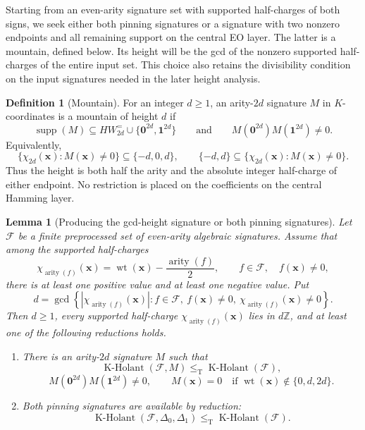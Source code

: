 \documentclass[11pt,letterpaper,onecolumn]{article}
\theoremstyle{plain}
\newtheorem{lemma}[lemma]{Lemma}
\theoremstyle{definition}
\newtheorem{definition}[definition]{Definition}
\theoremstyle{remark}
\newcommand{\cF}{\mathcal F}
\newcommand{\KHolant}{\operatorname{K\text{-}Holant}}
\newcommand{\wt}{\operatorname{wt}}
\newcommand{\supp}{\operatorname{supp}}
\newcommand{\arity}{\operatorname{arity}}
\newcommand{\one}{\mathbf 1}
\newcommand{\zero}{\mathbf 0}
\newcommand{\DeltaZero}{\Delta_0}
\newcommand{\DeltaOne}{\Delta_1}
\newcommand{\leT}{\leq_{\mathrm T}}
\begin{document}
Starting from an even-arity signature set with supported half-charges of
both signs, we seek either both pinning signatures or a signature with two
nonzero endpoints and all remaining support on the central EO layer.
The latter is a mountain, defined below.  Its height will be the gcd of
the nonzero supported half-charges of the entire input set.  This choice
also retains the divisibility condition on the input signatures needed
in the later height analysis.

	\begin{definition}[Mountain]
		\label{def:mountain}
		For an integer \(d\ge1\), an arity-\(2d\) signature \(M\) in
		\(K\)-coordinates is a mountain of height \(d\) if
		\[
		\supp(M)\subseteq HW_{2d}^=\cup\{\zero^{2d},\one^{2d}\}
		\qquad\text{and}\qquad
		M(\zero^{2d})M(\one^{2d})\ne0.
		\]
		Equivalently,
		\[
		\{\chi_{2d}({\mathbf x}):M({\mathbf x})\ne0\}\subseteq\{-d,0,d\},
		\qquad
		\{-d,d\}\subseteq\{\chi_{2d}({\mathbf x}):M({\mathbf x})\ne0\}.
		\]
		Thus the height is both half the arity and the absolute integer half-charge
		of either endpoint.  No restriction is placed on the coefficients on the central Hamming layer.
	\end{definition}

	\begin{lemma}[Producing the gcd-height signature or both pinning signatures]
		\label{lem:charge-bridge}
        Let \(\cF\) be a finite preprocessed set of even-arity algebraic
        signatures.
		Assume that among the supported half-charges
		\[
        \chi_{\arity(f)}({\mathbf x})=\wt({\mathbf x})-\frac{\arity(f)}2,
		\qquad f\in\cF,\quad f({\mathbf x})\ne0,
		\]
		there is at least one positive value and at least one negative value.  Put
		\[
		d=\gcd\left\{
        \left|\chi_{\arity(f)}({\mathbf x})\right|:
        f\in\cF,\ f({\mathbf x})\ne0,\
        \chi_{\arity(f)}({\mathbf x})\ne0
		\right\}.
		\]
        Then \(d\ge1\), every supported half-charge
        \(\chi_{\arity(f)}({\mathbf x})\) lies in \(d\mathbb Z\), and at least one of the
		following reductions holds.
		\begin{enumerate}
			\item There is an arity-\(2d\) signature \(M\) such that
			\[
			\KHolant(\cF,M)\leT\KHolant(\cF),
			\]
			\[
			M(\zero^{2d})M(\one^{2d})\ne0,
			\qquad
			M({\mathbf x})=0\quad\text{if }\wt({\mathbf x})\notin\{0,d,2d\}.
			\]
			\item Both pinning signatures are available by reduction:
			\[
			\KHolant(\cF,\DeltaZero,\DeltaOne)
			\leT\KHolant(\cF).
			\]
		\end{enumerate}
	\end{lemma}
	
\end{document}

